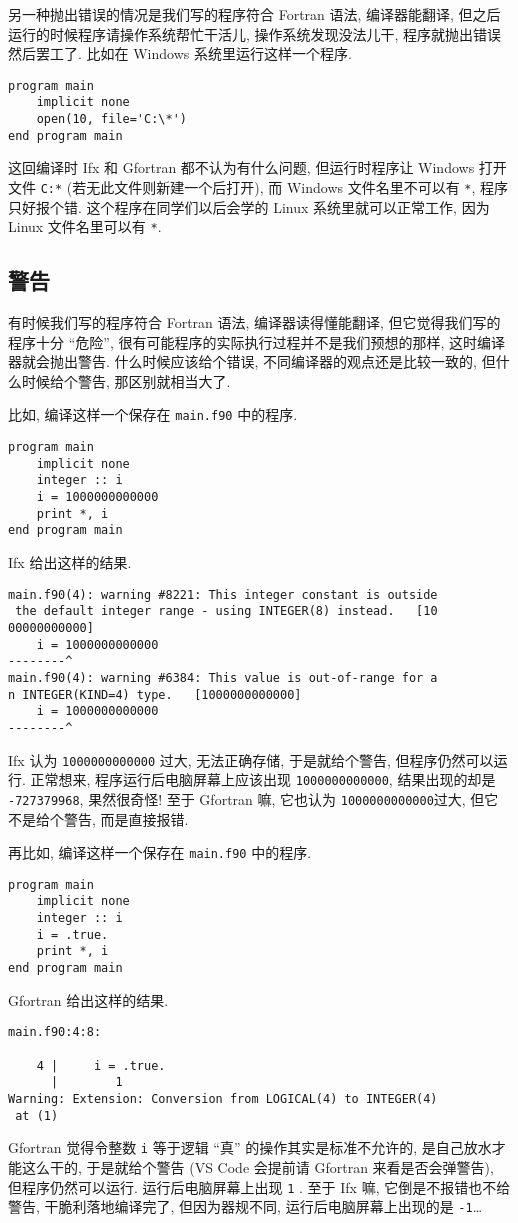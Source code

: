 另一种抛出错误的情况是我们写的程序符合 Fortran 语法, 编译器能翻译, 但之后运行的时候程序请操作系统帮忙干活儿, 操作系统发现没法儿干, 程序就抛出错误然后罢工了. 比如在 Windows 系统里运行这样一个程序.
\begin{lstlisting}
program main
    implicit none
    open(10, file='C:\*')
end program main
\end{lstlisting}
这回编译时 Ifx 和 Gfortran 都不认为有什么问题, 但运行时程序让 Windows 打开文件 \texttt{C:\bs{}*} (若无此文件则新建一个后打开), 而 Windows 文件名里不可以有 \texttt{*}, 程序只好报个错. 这个程序在同学们以后会学的 Linux 系统里就可以正常工作, 因为 Linux 文件名里可以有 \texttt{*}.

\subsection{警告}\label{fortran_warning}

有时候我们写的程序符合 Fortran 语法, 编译器读得懂能翻译, 但它觉得我们写的程序十分 ``危险'', 很有可能程序的实际执行过程并不是我们预想的那样, 这时编译器就会抛出警告. 什么时候应该给个错误, 不同编译器的观点还是比较一致的, 但什么时候给个警告, 那区别就相当大了.

比如, 编译这样一个保存在 \texttt{main.f90} 中的程序.
\begin{lstlisting}
program main
    implicit none
    integer :: i
    i = 1000000000000
    print *, i
end program main
\end{lstlisting}
Ifx 给出这样的结果.
\begin{verbatim}
main.f90(4): warning #8221: This integer constant is outside
 the default integer range - using INTEGER(8) instead.   [10
00000000000]
    i = 1000000000000
--------^
main.f90(4): warning #6384: This value is out-of-range for a
n INTEGER(KIND=4) type.   [1000000000000]
    i = 1000000000000
--------^
\end{verbatim}
Ifx 认为 \texttt{1000000000000} 过大, 无法正确存储, 于是就给个警告, 但程序仍然可以运行. 正常想来, 程序运行后电脑屏幕上应该出现 \texttt{1000000000000}, 结果出现的却是 \texttt{-727379968}, 果然很奇怪! 至于 Gfortran 嘛, 它也认为 \texttt{1000000000000}过大, 但它不是给个警告, 而是直接报错.

再比如, 编译这样一个保存在 \texttt{main.f90} 中的程序.
\begin{lstlisting}
program main
    implicit none
    integer :: i
    i = .true.
    print *, i
end program main
\end{lstlisting}
Gfortran 给出这样的结果.
\begin{verbatim}
main.f90:4:8:

    4 |     i = .true.
      |        1
Warning: Extension: Conversion from LOGICAL(4) to INTEGER(4)
 at (1)
\end{verbatim}
Gfortran 觉得令整数 \texttt{i} 等于逻辑 ``真'' 的操作其实是标准不允许的, 是自己放水才能这么干的, 于是就给个警告 (VS Code 会提前请 Gfortran 来看是否会弹警告), 但程序仍然可以运行. 运行后电脑屏幕上出现 \texttt{1} . 至于 Ifx 嘛, 它倒是不报错也不给警告, 干脆利落地编译完了, 但因为器规不同, 运行后电脑屏幕上出现的是 \texttt{-1}\dots{}

